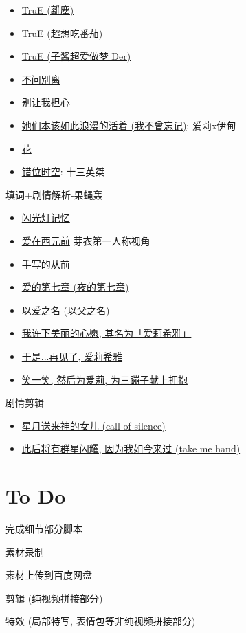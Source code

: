 \documentclass[a4paper]{article}
\begin{document}
\begin{itemize}
    \item \href{https://www.bilibili.com/video/BV1gB4y1V7XK/}{TruE (離塵)}
    \item \href{https://www.bilibili.com/video/BV1SF411w73C/}{TruE (超想吃番茄)}
    \item \href{https://www.bilibili.com/video/BV1MB4y1V71h/}{TruE (子酱超爱做梦 Der)}
    \item \href{https://www.bilibili.com/video/BV19a4y1S7wF/}{不问别离}
    \item \href{https://www.bilibili.com/video/BV1vC4y177zp/}{别让我担心}
    \item \href{https://www.bilibili.com/video/BV1pu411a7cv/}{她们本该如此浪漫的活着 (我不曾忘记)}: 爱莉x伊甸
    \item \href{https://www.bilibili.com/video/BV1DT41167gi/}{花}
    \item \href{https://www.bilibili.com/video/BV1Le4y1R73E/}{错位时空}: 十三英桀
\end{itemize}

填词+剧情解析-果蝇轰

\begin{itemize}
    \item \href{https://www.bilibili.com/video/BV1HppJeuEis/}{闪光灯记忆}
    \item \href{https://www.bilibili.com/video/BV1 qN411g71m/}{爱在西元前} 芽衣第一人称视角
    \item \href{https://www.bilibili.com/video/BV1PV4y1x7CD/}{手写的从前}
    \item \href{https://www.bilibili.com/video/BV1dr4y177gy/}{爱的第七章 (夜的第七章)}
    \item \href{https://www.bilibili.com/video/BV1Yr4y1q7Pt/}{以爱之名 (以父之名)}
    \item \href{https://www.bilibili.com/video/BV1BF411w7fD/}{我许下美丽的心愿, 其名为「爱莉希雅」}
    \item \href{https://www.bilibili.com/video/BV1Cr4y1573W/}{于是...再见了, 爱莉希雅}
    \item \href{https://www.bilibili.com/video/BV1WN4y1L745/}{笑一笑, 然后为爱莉, 为三蹦子献上拥抱}
\end{itemize}

剧情剪辑

\begin{itemize}
    \item \href{https://www.bilibili.com/video/BV1ZT4y1s7Zd/}{星月送来神的女儿 (call of silence)}
    \item \href{https://www.bilibili.com/video/BV1Sm41167aK/}{此后将有群星闪耀, 因为我如今来过 (take me hand)}
\end{itemize}

\section{To Do}

完成细节部分脚本

素材录制

素材上传到百度网盘

剪辑 (纯视频拼接部分)

特效 (局部特写, 表情包等非纯视频拼接部分)
\end{document}
